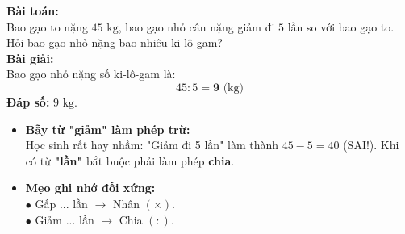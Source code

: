 \documentclass[12pt,a4paper]{article}
\begin{document}
\vspace{-2.5mm}
\noindent
\begin{minipage}[t]{0.49\textwidth}\vspace{0pt}
\begin{tcolorbox}[
  enhanced,
  colback=green!4!white,
  colframe=green!60!black,
  arc=2mm, boxrule=0.8pt,
  left=2mm, right=2mm, top=1.8mm, bottom=1.8mm,
  title={\footnotesize\bfseries\color{white}\faCheckCircle\ Ví dụ thực hành chuẩn mực}
]
{\footnotesize
\textbf{Bài toán:}\\
Bao gạo to nặng $45\text{ kg}$, bao gạo nhỏ cân nặng giảm đi $5$ lần so với bao gạo to. Hỏi bao gạo nhỏ nặng bao nhiêu ki-lô-gam?\\
\textbf{Bài giải:}\\
Bao gạo nhỏ nặng số ki-lô-gam là:
$$45 : 5 = \mathbf{9}\text{ (kg)}$$
\textbf{Đáp số:} $9\text{ kg}$.
}
\end{tcolorbox}
\end{minipage}
\hfill
\begin{minipage}[t]{0.49\textwidth}\vspace{0pt}
\begin{tcolorbox}[
  enhanced,
  colback=red!4!white,
  colframe=red!70!black,
  arc=2mm, boxrule=0.8pt,
  left=2mm, right=2mm, top=1.8mm, bottom=1.8mm,
  title={\footnotesize\bfseries\color{white}\faExclamationTriangle\ Mẹo tránh bẫy trắc nghiệm}
]
{\footnotesize
\begin{itemize}\setlength{\itemsep}{1.5pt}\setlength{\leftskip}{-2.5mm}
  \item \textbf{Bẫy từ "giảm" làm phép trừ:}\\
  Học sinh rất hay nhầm: "Giảm đi 5 lần" làm thành $45 - 5 = 40$ (SAI!). Khi có từ \textbf{"lần"} bắt buộc phải làm phép \textbf{chia}.
  \item \textbf{Mẹo ghi nhớ đối xứng:}\\
  $\bullet$ Gấp ... lần $\to$ Nhân $(\times)$.\\
  $\bullet$ Giảm ... lần $\to$ Chia $(:)$.
\end{itemize}
}
\end{tcolorbox}
\end{minipage}
\end{document}
